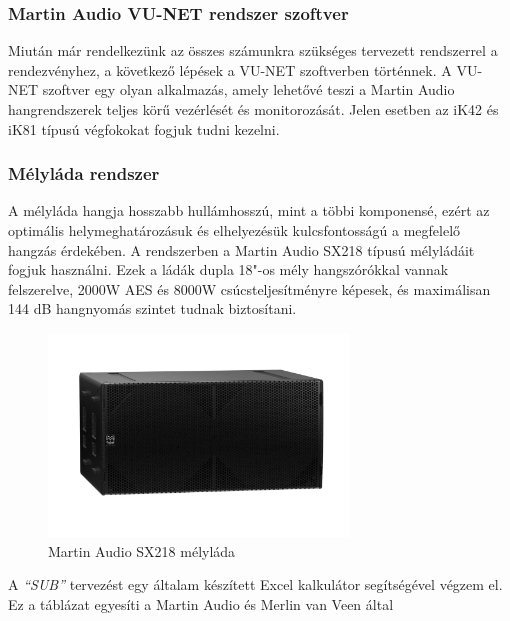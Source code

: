 \subsubsection{Martin Audio VU-NET rendszer szoftver \cite{VUNETUSERGUIDE}}
Miután már rendelkezünk az összes számunkra szükséges tervezett rendszerrel a rendezvényhez, a következő lépések a VU-NET szoftverben történnek.
A VU-NET szoftver egy olyan alkalmazás, amely lehetővé teszi a Martin Audio hangrendszerek teljes körű vezérlését és monitorozását.
Jelen esetben az iK42 és iK81 típusú végfokokat fogjuk tudni kezelni. 

\subsubsection{Mélyláda rendszer}
A mélyláda hangja hosszabb hullámhosszú, mint a többi komponensé, ezért az
optimális helymeghatározásuk és elhelyezésük kulcsfontosságú a megfelelő
hangzás érdekében. 
A rendszerben a Martin Audio SX218 típusú mélyládáit fogjuk használni.
Ezek a ládák dupla 18"-os mély hangszórókkal vannak felszerelve, 2000W AES és 8000W csúcsteljesítményre képesek, és
maximálisan 144 dB hangnyomás szintet tudnak biztosítani. \cite{SXSUBWOOFERUSERGUIDE}
\begin{figure}[H]
	\centering
	\includegraphics[width=80mm, keepaspectratio]{figures/sx218_front_view.jpg}
	\caption{Martin Audio SX218 mélyláda}\label{fig:sx218}
\end{figure}
A \textit{``SUB''} tervezést egy általam készített Excel kalkulátor
segítségével végzem el. Ez a táblázat egyesíti a Martin Audio és Merlin van Veen által
